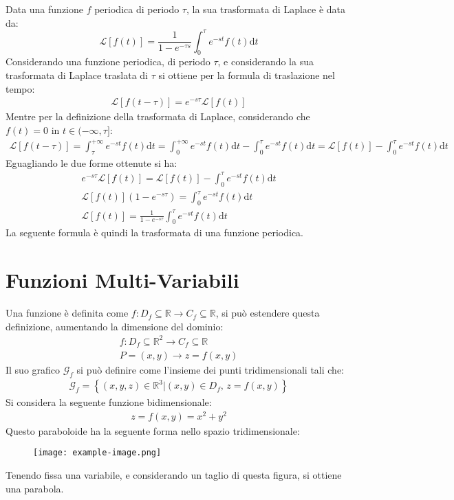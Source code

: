 \documentclass{article}
\newcommand{\df}{\mathrm{d}}
\numberwithin{equation}{subsection}
\begin{document}
Data una funzione $f$ periodica di periodo $\tau$, la sua trasformata di Laplace è data da:
\begin{equation}
    \mathcal{L}\left[f(t)\right]=\frac{1}{1-e^{-\tau s}}\int_0^\tau e^{-st}f(t)\df t
\end{equation}
Considerando una funzione periodica, di periodo $\tau$, e considerando la sua trasformata di Laplace traslata di $\tau$ si ottiene per la formula di traslazione nel tempo:
\begin{gather*}
    \mathcal{L}\left[f(t-\tau)\right]=e^{-s\tau}\mathcal{L}\left[f(t)\right]
\end{gather*}
Mentre per la definizione della trasformata di Laplace, considerando che $f(t)=0$ in $t\in(-\infty,\tau]$:
\begin{gather*}
    \mathcal{L}\left[f(t-\tau)\right]=
    \int_{\tau}^{+\infty}e^{-st}f(t)\df t=
    \int_{0}^{+\infty}e^{-st}f(t)\df t-\int_{0}^{\tau}e^{-st}f(t)\df t=
    \mathcal{L}\left[f(t)\right]-\int_0^\tau e^{-st}f(t)\df t
\end{gather*}
Eguagliando le due forme ottenute si ha:
\begin{gather*}
    e^{-s\tau}\mathcal{L}\left[f(t)\right]=\mathcal{L}\left[f(t)\right]-\int_0^\tau e^{-st}f(t)\df t\\
    \mathcal{L}\left[f(t)\right]\left(1-e^{-s\tau}\right)=\int_0^\tau e^{-st}f(t)\df t\\
    \mathcal{L}\left[f(t)\right]=\frac{1}{1-e^{-s\tau}}\int_0^\tau e^{-st}f(t)\df t
\end{gather*}
La seguente formula è quindi la trasformata di una funzione periodica. 

\clearpage

\section{Funzioni Multi-Variabili}


Una funzione è definita come $f:D_f\subseteq\mathbb{R}\to C_f\subseteq\mathbb{R}$, si può estendere questa definizione, aumentando la dimensione del dominio:
\begin{gather*}
    f:D_f\subseteq\mathbb{R}^2\to C_f\subseteq\mathbb{R}\\
    P=(x,y)\rightarrow z=f(x,y)
\end{gather*}
Il suo grafico $\mathscr{G}_f$ si può definire come l'insieme dei punti tridimensionali tali che:
\begin{gather*}
    \mathscr{G}_f=\left\{(x,y,z)\in\mathbb{R}^3\big|(x,y)\in D_f,\,z=f(x,y)\right\}
\end{gather*}
Si considera la seguente funzione bidimensionale:
\begin{gather*}
    z=f(x,y)=x^2+y^2
\end{gather*}
Questo paraboloide ha la seguente forma nello spazio tridimensionale: 
\begin{figure}[H]
    \centering%
    \texttt{[image: example-image.png]}%
\end{figure}
Tenendo fissa una variabile, e considerando un taglio di questa figura, si ottiene una parabola. 
\end{document}
